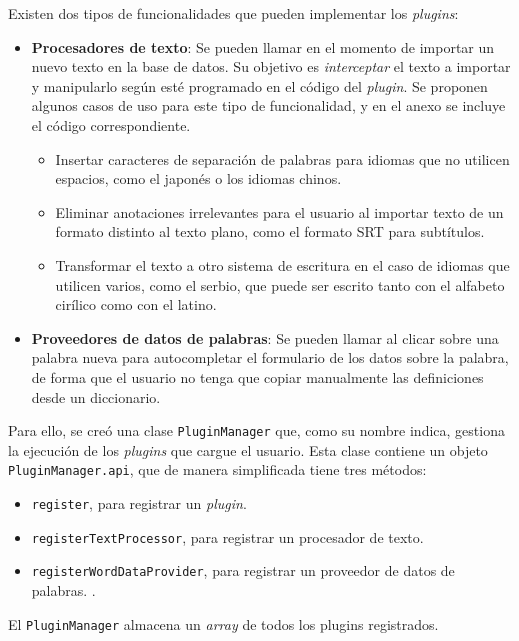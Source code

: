 Existen dos tipos de funcionalidades que pueden implementar los \textit{plugins}:
\begin{itemize}
	\item \textbf{Procesadores de texto}: Se pueden llamar en el momento de importar un nuevo texto en la base de datos. Su objetivo es \textit{interceptar} el texto a importar y manipularlo según esté programado en el código del \textit{plugin}. Se proponen algunos casos de uso para este tipo de funcionalidad, y en el anexo se incluye el código correspondiente.
	\begin{itemize}[label=$\star$]
		\item Insertar caracteres de separación de palabras para idiomas que no utilicen espacios, como el japonés o los idiomas chinos.
		\item Eliminar anotaciones irrelevantes para el usuario al importar texto de un formato distinto al texto plano, como el formato SRT para subtítulos.
		\item Transformar el texto a otro sistema de escritura en el caso de idiomas que utilicen varios, como el serbio, que puede ser escrito tanto con el alfabeto cirílico como con el latino.
	\end{itemize}
	\item \textbf{Proveedores de datos de palabras}: Se pueden llamar al clicar sobre una palabra nueva para autocompletar el formulario de los datos sobre la palabra, de forma que el usuario no tenga que copiar manualmente las definiciones desde un diccionario.
\end{itemize}

Para ello, se creó una clase \texttt{PluginManager} que, como su nombre indica, gestiona la ejecución de los \textit{plugins} que cargue el usuario. Esta clase contiene un objeto \texttt{PluginManager.api}, que de manera simplificada tiene tres métodos:

\begin{itemize}
	\item \texttt{register}, para registrar un \textit{plugin}.
	\item \texttt{registerTextProcessor}, para registrar un procesador de texto.
	\item \texttt{registerWordDataProvider}, para registrar un proveedor de datos de palabras. .	
\end{itemize}

El \texttt{PluginManager} almacena un \textit{array} de todos los plugins registrados.

